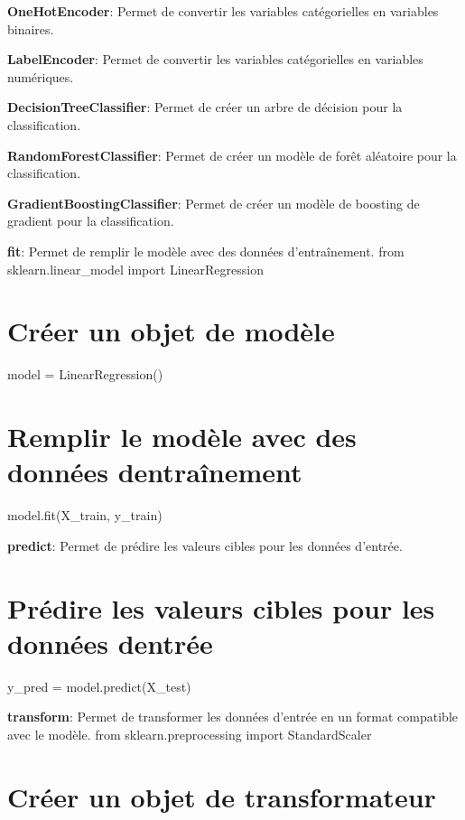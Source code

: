 \begin{DoxyEnumerate}
\item {\bfseries One\+Hot\+Encoder}\+: Permet de convertir les variables catégorielles en variables binaires.
\item {\bfseries Label\+Encoder}\+: Permet de convertir les variables catégorielles en variables numériques.
\item {\bfseries Decision\+Tree\+Classifier}\+: Permet de créer un arbre de décision pour la classification.
\item {\bfseries Random\+Forest\+Classifier}\+: Permet de créer un modèle de forêt aléatoire pour la classification.
\item {\bfseries Gradient\+Boosting\+Classifier}\+: Permet de créer un modèle de boosting de gradient pour la classification.
\end{DoxyEnumerate}
\begin{DoxyEnumerate}
\item {\bfseries fit}\+: Permet de remplir le modèle avec des données d’entraînement. from sklearn.\+linear\+\_\+model import Linear\+Regression \section*{Créer un objet de modèle}
\end{DoxyEnumerate}

model = Linear\+Regression() \section*{Remplir le modèle avec des données d\textquotesingle{}entraînement}

model.\+fit(\+X\+\_\+train, y\+\_\+train)


\begin{DoxyEnumerate}
\item {\bfseries predict}\+: Permet de prédire les valeurs cibles pour les données d’entrée. \section*{Prédire les valeurs cibles pour les données d\textquotesingle{}entrée}
\end{DoxyEnumerate}

y\+\_\+pred = model.\+predict(\+X\+\_\+test)


\begin{DoxyEnumerate}
\item {\bfseries transform}\+: Permet de transformer les données d’entrée en un format compatible avec le modèle. from sklearn.\+preprocessing import Standard\+Scaler \section*{Créer un objet de transformateur}
\end{DoxyEnumerate}

